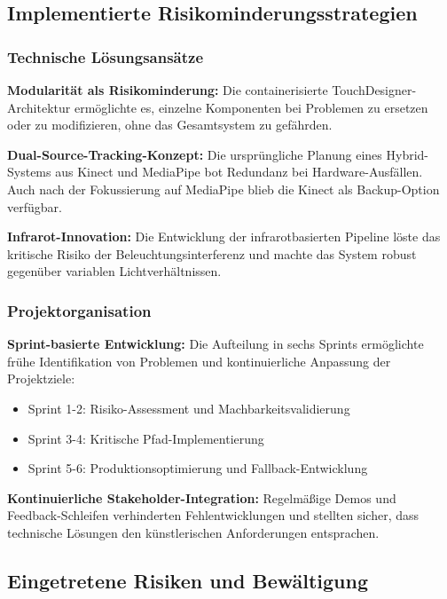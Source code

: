 \subsection{Implementierte Risikominderungsstrategien}

\subsubsection{Technische Lösungsansätze}

\textbf{Modularität als Risikominderung:}
Die containerisierte TouchDesigner-Architektur ermöglichte es, einzelne Komponenten bei Problemen zu ersetzen oder zu modifizieren, ohne das Gesamtsystem zu gefährden.

\textbf{Dual-Source-Tracking-Konzept:}
Die ursprüngliche Planung eines Hybrid-Systems aus Kinect und MediaPipe bot Redundanz bei Hardware-Ausfällen. Auch nach der Fokussierung auf MediaPipe blieb die Kinect als Backup-Option verfügbar.

\textbf{Infrarot-Innovation:}
Die Entwicklung der infrarotbasierten Pipeline löste das kritische Risiko der Beleuchtungsinterferenz und machte das System robust gegenüber variablen Lichtverhältnissen.

\subsubsection{Projektorganisation}

\textbf{Sprint-basierte Entwicklung:}
Die Aufteilung in sechs Sprints ermöglichte frühe Identifikation von Problemen und kontinuierliche Anpassung der Projektziele:

\begin{itemize}
    \item Sprint 1-2: Risiko-Assessment und Machbarkeitsvalidierung
    \item Sprint 3-4: Kritische Pfad-Implementierung
    \item Sprint 5-6: Produktionsoptimierung und Fallback-Entwicklung
\end{itemize}

\textbf{Kontinuierliche Stakeholder-Integration:}
Regelmäßige Demos und Feedback-Schleifen verhinderten Fehlentwicklungen und stellten sicher, dass technische Lösungen den künstlerischen Anforderungen entsprachen.

\subsection{Eingetretene Risiken und Bewältigung}

